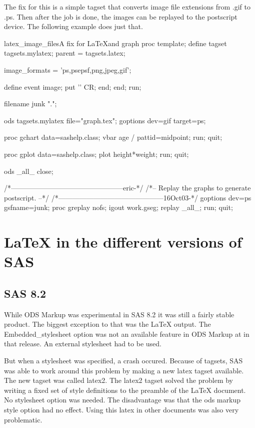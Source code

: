The fix for this is a simple tagset that converts image file extensions from
.gif to .ps.  Then after the job is done, the images can be replayed to the
postscript device.  The following example does just that.

\begin{fvcode}{latex_image_files}{A fix for \LaTeX and graph}
 proc template;
    define tagset tagsets.mylatex;
       parent = tagsets.latex;

       image_formats = 'ps,psepsf,png,jpeg,gif';

        define event image;
            put '' CR;
        end;
    end;
 run;          

filename junk ".";

ods tagsets.mylatex file="graph.tex";
goptions dev=gif target=ps;

proc gchart data=sashelp.class;
vbar age / pattid=midpoint;
run;
quit;

proc gplot data=sashelp.class;
plot height*weight;
run;
quit;

ods _all_ close;

/*------------------------------------------------eric-*/
/*-- Replay the graphs to generate postscript.       --*/
/*---------------------------------------------16Oct03-*/
goptions dev=ps gsfname=junk;
proc greplay nofs;
   igout work.gseg;
   replay _all_;
run;
quit;
\end{fvcode}


\section{LaTeX in the different versions of SAS}
\subsection{SAS 8.2}
While ODS Markup was experimental in SAS 8.2 it was still a fairly 
stable product.  The biggest exception to that was the LaTeX output.
The Embedded\_stylesheet option was not an available feature in ODS 
Markup at in that release.  An external stylesheet had to be used.  

But when
a stylesheet was specified, a crash occured.  Because of tagsets,
SAS was able to work around this problem by making a new latex
tagset available.  The new tagset was called latex2.  The latex2
tagset solved the problem by writing a fixed set of style definitions
to the preamble of the LaTeX document.  No stylesheet option was needed.
The disadvantage was that the ods markup style option had no effect.
Using this latex in other documents was also very problematic.


